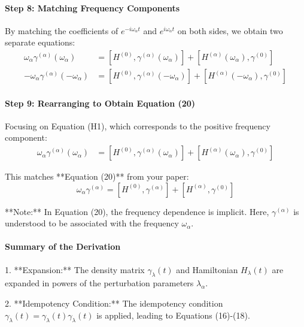\documentclass[12pt]{article}
\begin{document}
\paragraph{Step 8: Matching Frequency Components}

By matching the coefficients of \( e^{-i \omega_{\alpha} t} \) and \( e^{i \omega_{\alpha} t} \) on both sides, we obtain two separate equations:
\begin{align}
\omega_{\alpha} \gamma^{(\alpha)}(\omega_{\alpha}) &= [H^{(0)}, \gamma^{(\alpha)}(\omega_{\alpha})] + [H^{(\alpha)}(\omega_{\alpha}), \gamma^{(0)}]  \\
-\omega_{\alpha} \gamma^{(\alpha)}(-\omega_{\alpha}) &= [H^{(0)}, \gamma^{(\alpha)}(-\omega_{\alpha})] + [H^{(\alpha)}(-\omega_{\alpha}), \gamma^{(0)}] 
\end{align}

\paragraph{Step 9: Rearranging to Obtain Equation (20)}

Focusing on Equation (H1), which corresponds to the positive frequency component:
\begin{align}
\omega_{\alpha} \gamma^{(\alpha)}(\omega_{\alpha}) &= [H^{(0)}, \gamma^{(\alpha)}(\omega_{\alpha})] + [H^{(\alpha)}(\omega_{\alpha}), \gamma^{(0)}] 
\end{align}

This matches **Equation (20)** from your paper:
\begin{equation}
\omega_{\alpha} \gamma^{(\alpha)} = [H^{(0)}, \gamma^{(\alpha)}] + [H^{(\alpha)}, \gamma^{(0)}] 
\end{equation}

**Note:** In Equation (20), the frequency dependence is implicit. Here, \( \gamma^{(\alpha)} \) is understood to be associated with the frequency \( \omega_{\alpha} \).

\paragraph{Summary of the Derivation}

1. **Expansion:** The density matrix \( \gamma_{\lambda}(t) \) and Hamiltonian \( H_{\lambda}(t) \) are expanded in powers of the perturbation parameters \( \lambda_{\alpha} \).

2. **Idempotency Condition:** The idempotency condition \( \gamma_{\lambda}(t) = \gamma_{\lambda}(t) \gamma_{\lambda}(t) \) is applied, leading to Equations (16)-(18).
\end{document}
